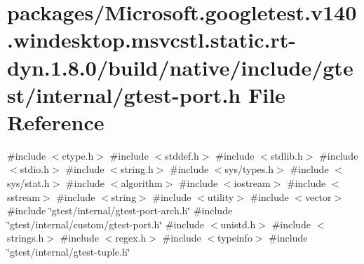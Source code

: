 \hypertarget{gtest-port_8h}{}\section{packages/\+Microsoft.googletest.\+v140.\+windesktop.\+msvcstl.\+static.\+rt-\/dyn.1.8.0/build/native/include/gtest/internal/gtest-\/port.h File Reference}
\label{gtest-port_8h}
{\ttfamily \#include $<$ctype.\+h$>$}\newline
{\ttfamily \#include $<$stddef.\+h$>$}\newline
{\ttfamily \#include $<$stdlib.\+h$>$}\newline
{\ttfamily \#include $<$stdio.\+h$>$}\newline
{\ttfamily \#include $<$string.\+h$>$}\newline
{\ttfamily \#include $<$sys/types.\+h$>$}\newline
{\ttfamily \#include $<$sys/stat.\+h$>$}\newline
{\ttfamily \#include $<$algorithm$>$}\newline
{\ttfamily \#include $<$iostream$>$}\newline
{\ttfamily \#include $<$sstream$>$}\newline
{\ttfamily \#include $<$string$>$}\newline
{\ttfamily \#include $<$utility$>$}\newline
{\ttfamily \#include $<$vector$>$}\newline
{\ttfamily \#include \char`\"{}gtest/internal/gtest-\/port-\/arch.\+h\char`\"{}}\newline
{\ttfamily \#include \char`\"{}gtest/internal/custom/gtest-\/port.\+h\char`\"{}}\newline
{\ttfamily \#include $<$unistd.\+h$>$}\newline
{\ttfamily \#include $<$strings.\+h$>$}\newline
{\ttfamily \#include $<$regex.\+h$>$}\newline
{\ttfamily \#include $<$typeinfo$>$}\newline
{\ttfamily \#include \char`\"{}gtest/internal/gtest-\/tuple.\+h\char`\"{}}\newline

